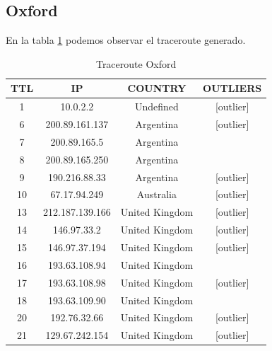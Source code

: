 \subsection{Oxford}


En la tabla \ref{traceroute-oxford-con-ceros} podemos observar el traceroute generado. 


\begin{table}[!htbp]
\centering
\caption{Traceroute Oxford}
\label{traceroute-oxford-con-ceros}
\begin{tabular}{|c|c|c|c|}
\hline
\textbf{TTL} & \textbf{IP}       & \textbf{COUNTRY} & \textbf{OUTLIERS} \\ \hline
1            & 10.0.2.2          & Undefined        & {[}outlier{]}     \\ \hline
6            & 200.89.161.137    & Argentina        & {[}outlier{]}     \\ \hline
7            & 200.89.165.5      & Argentina        &                   \\ \hline
8            & 200.89.165.250    & Argentina        &                   \\ \hline
9            & 190.216.88.33     & Argentina        & {[}outlier{]}     \\ \hline
10           & 67.17.94.249      & Australia        & {[}outlier{]}     \\ \hline
13           & 212.187.139.166   & United Kingdom   & {[}outlier{]}     \\ \hline
14           & 146.97.33.2       & United Kingdom   & {[}outlier{]}     \\ \hline
15           & 146.97.37.194     & United Kingdom   & {[}outlier{]}     \\ \hline
16           & 193.63.108.94     & United Kingdom   &                   \\ \hline
17           & 193.63.108.98     & United Kingdom   & {[}outlier{]}     \\ \hline
18           & 193.63.109.90     & United Kingdom   &                   \\ \hline
20           & 192.76.32.66      & United Kingdom   & {[}outlier{]}     \\ \hline
21           & 129.67.242.154    & United Kingdom   & {[}outlier{]}     \\ \hline
\end{tabular}
\end{table}


